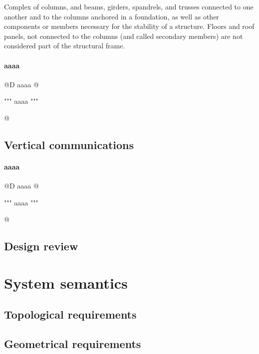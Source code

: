 \documentclass[11pt,oneside]{article}    %
\begin{document}
Complex of columns, and beams, girders, spandrels, and trusses connected to one another and to the columns anchored in a foundation, as well as other components or members necessary for the stability of a structure. Floors and roof panels, not connected to the columns (and called secondary members) are not considered part of the structural frame.

\paragraph{aaaa}
@D aaaa
@{""" aaaa """

@}

\subsection{Vertical communications}


\paragraph{aaaa}
@D aaaa
@{""" aaaa """

@}

\subsection{Design review}


\section{System semantics}

\subsection{Topological requirements}

\subsection{Geometrical requirements}
\end{document}
